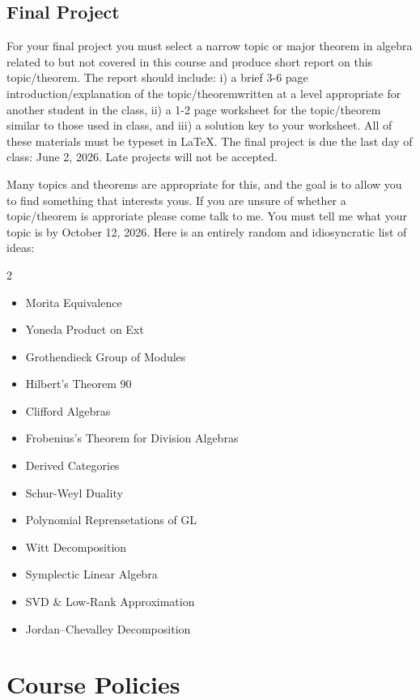\documentclass[11pt,letterpaper]{article}
\newcommand{\pageheading}[1]{\section*{#1}\addcontentsline{toc}{section}{#1}}
\begin{document}
\subsection*{Final Project}

For your final project you must select a narrow topic or major theorem in algebra related to but not covered in this course and produce short report on this topic/theorem. The report should include: i) a brief 3-6 page introduction/explanation of the topic/theoremwritten at a level appropriate for another student in the class, ii) a 1-2 page worksheet for the topic/theorem similar to those used in class, and iii) a solution key to your worksheet. All of these materials must be typeset in LaTeX. The final project is due the last day of class: June 2, 2026. Late projects will not be accepted.

Many topics and theorems are appropriate for this, and the goal is to allow you to find something that interests yous. If you are unsure of whether a topic/theorem is approriate please come talk to me. You must tell me what your topic is by October 12, 2026. Here is an entirely random and idiosyncratic list of ideas:

\setlength{\columnsep}{24pt}\setlength{\multicolsep}{4pt}
\begin{multicols}{2}
\fontsize{10}{12.5}\selectfont
\begin{itemize}
\item Morita Equivalence
\item Yoneda Product on Ext
\item Grothendieck Group of Modules
\item Hilbert's Theorem 90
\item Clifford Algebras
\item Frobenius's Theorem for Division Algebras
\item Derived Categories
\item Schur-Weyl Duality
\item Polynomial Reprensetations of GL
\item Witt Decomposition
\item Symplectic Linear Algebra
\item SVD \& Low-Rank Approximation
\item Jordan--Chevalley Decomposition
\end{itemize}
\end{multicols}

\endgroup
\clearpage
\pageheading{Course Policies}
\end{document}
